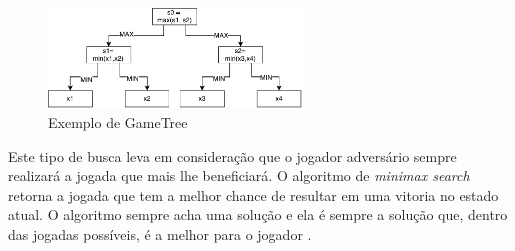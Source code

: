 \begin{figure}[ht]
	\centering
	\includegraphics[width=0.6\textwidth]{fig/gametree.pdf}
	\caption{Exemplo de GameTree}
	\label{fig:gametree}
\end{figure} 

Este tipo de busca leva em consideração que o jogador adversário sempre realizará a jogada que mais lhe beneficiará. O algoritmo de \textit{minimax search} retorna a jogada que tem a melhor chance de resultar em uma vitoria no estado atual. O algoritmo sempre acha uma solução e ela é sempre a solução que, dentro das jogadas possíveis, é a melhor para o jogador \cite{intelligence2003modern}.  


